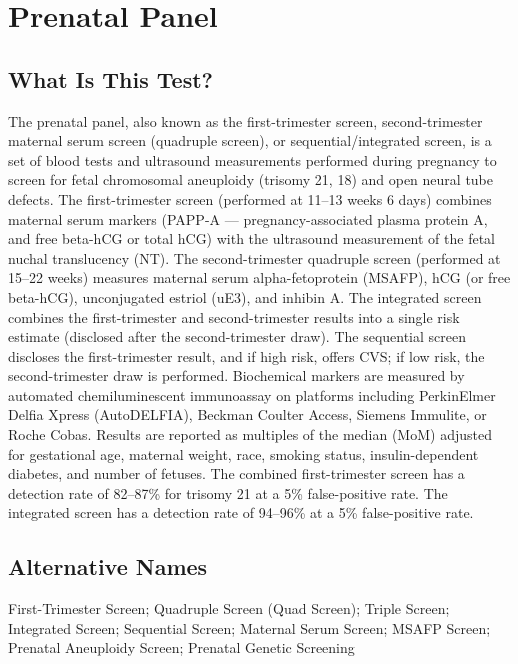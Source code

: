 \chapter{Prenatal Panel}

\section*{What Is This Test?}
The prenatal panel, also known as the first-trimester screen, second-trimester maternal serum screen (quadruple screen), or sequential/integrated screen, is a set of blood tests and ultrasound measurements performed during pregnancy to screen for fetal chromosomal aneuploidy (trisomy 21, 18) and open neural tube defects. The first-trimester screen (performed at 11--13 weeks 6 days) combines maternal serum markers (PAPP-A --- pregnancy-associated plasma protein A, and free beta-hCG or total hCG) with the ultrasound measurement of the fetal nuchal translucency (NT). The second-trimester quadruple screen (performed at 15--22 weeks) measures maternal serum alpha-fetoprotein (MSAFP), hCG (or free beta-hCG), unconjugated estriol (uE3), and inhibin A. The integrated screen combines the first-trimester and second-trimester results into a single risk estimate (disclosed after the second-trimester draw). The sequential screen discloses the first-trimester result, and if high risk, offers CVS; if low risk, the second-trimester draw is performed. Biochemical markers are measured by automated chemiluminescent immunoassay on platforms including PerkinElmer Delfia Xpress (AutoDELFIA), Beckman Coulter Access, Siemens Immulite, or Roche Cobas. Results are reported as multiples of the median (MoM) adjusted for gestational age, maternal weight, race, smoking status, insulin-dependent diabetes, and number of fetuses. The combined first-trimester screen has a detection rate of 82--87\% for trisomy 21 at a 5\% false-positive rate. The integrated screen has a detection rate of 94--96\% at a 5\% false-positive rate.

\section*{Alternative Names}
First-Trimester Screen; Quadruple Screen (Quad Screen); Triple Screen; Integrated Screen; Sequential Screen; Maternal Serum Screen; MSAFP Screen; Prenatal Aneuploidy Screen; Prenatal Genetic Screening

